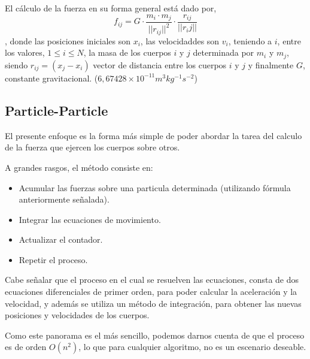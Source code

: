 


El cálculo de la fuerza en su forma general está dado por,
$$f_{ij} =G \cdot \frac{m_i \cdot m_j}{||r_{ij}||^{2}} \cdot \frac{r_{ij}}{||r_ij||}$$,
donde las posiciones iniciales son $x_i$,
las velocidaddes son $v_i$,
teniendo a $i$, entre los valores, $1 \leq i \leq N$,
la masa de los cuerpos $i$ y $j$ determinada por $m_i$ y $m_j$,
siendo $r_{ij} = (x_j - x_i )$ vector de distancia entre los cuerpos $i$ y $j$
y finalmente $G$, constante gravitacional. ($6,67428 \times 10^{-11} m^{3} kg^{-1} s^{-2}$)


\subsection{Particle-Particle}

El presente enfoque es la forma más simple de poder abordar
la tarea del calculo de la fuerza que ejercen los cuerpos sobre otros.

A grandes rasgos, el método consiste en:
\begin{itemize}
	\item Acumular las fuerzas sobre una particula determinada (utilizando fórmula anteriormente señalada).
	\item Integrar las ecuaciones de movimiento.
	\item Actualizar el contador.
	\item Repetir el proceso.
\end{itemize}

Cabe señalar que el proceso en el cual se resuelven las ecuaciones,
consta de dos ecuaciones diferenciales de primer orden,
para poder calcular la aceleración y la velocidad,
y además se utiliza un método de integración, para obtener
las nuevas posiciones y velocidades de los cuerpos.

Como este panorama es el más sencillo,
podemos darnos cuenta de que el proceso es de orden $O(n^{2})$,
lo que para cualquier algoritmo, no es un escenario
deseable.


